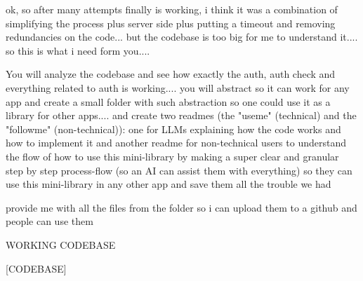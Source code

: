 ok, so after many attempts finally is working, i think it was a combination of simplifying the process plus server side plus putting a timeout and removing redundancies on the code... but the codebase is too big for me to understand it.... so this is what i need form you....

You will analyze the codebase and see how exactly the auth, auth check and everything related to auth is working.... you will abstract so it can work for any app and create a small folder with such abstraction so one could use it as a library for other apps.... and create two readmes (the "useme" (technical) and the "followme" (non-technical)): one for LLMs explaining how the code works and how to implement it and another readme for non-technical users to understand the flow of how to use this mini-library by making a super clear and granular step by step process-flow (so an AI can assist them with everything) so they can use this mini-library in any other app and save them all the trouble we had

provide me with all the files from the folder so i can upload them to a github and people can use them 

WORKING CODEBASE

[CODEBASE]